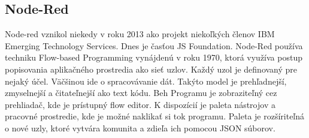 \documentclass[../../main.tex]{subfiles}
\begin{document}
\subsection{Node-Red}
Node-red vznikol niekedy v roku 2013 ako projekt niekoľkých členov IBM Emerging Technology Services. Dnes je časťou JS Foundation. Node-Red používa techniku Flow-based Programming vynájdenú v roku 1970, ktorá využíva  postup popisovania aplikačného prostredia ako sieť uzlov. Každý uzol je definovaný pre nejaký účel. Väčšinou ide o spracovávanie dát. Takýto model je prehľadnejší, zmyselnejší a čitateľnejší ako text kódu. Beh Programu je zobraziteľný cez prehliadač, kde je prístupný flow editor. K dispozícií je paleta nástrojov a pracovné prostredie, kde je možné naklikať si tok programu. Paleta je rozšíriteľná o nové uzly, ktoré vytvára komunita a zdieľa ich pomocou JSON súborov.\cite{nodered}
\end{document}
